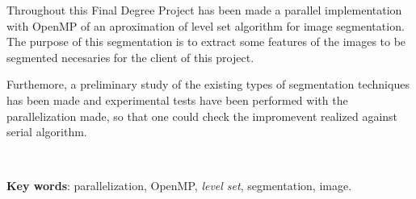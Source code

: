 
\thispagestyle{empty} 

Throughout this Final Degree Project has been made a parallel implementation with OpenMP of an aproximation of level set algorithm for image segmentation. The purpose of this segmentation is to extract some features of the images to be segmented necesaries for the client of this project. 

Furthemore, a preliminary study of the existing types of segmentation techniques has been made and experimental tests have been performed with the parallelization made, so that one could check the impromevent realized against serial algorithm.

\
 
\textbf{Key words}: parallelization, OpenMP, \textit{level set}, segmentation, image.

\clearpage                         %
\thispagestyle{empty} \ \clearpage %
